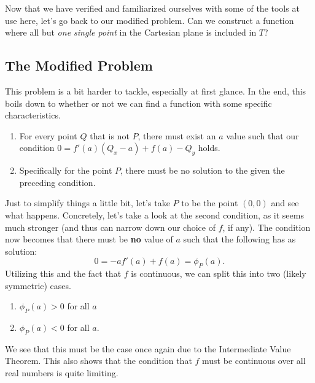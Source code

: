 Now that we have verified and familiarized ourselves with some of the tools at
use here, let's go back to our modified problem. Can we construct a function
where all but \textit{one single point} in the Cartesian plane is included in \( T \)?

\subsection{The Modified Problem}

This problem is a bit harder to tackle, especially at first glance. In the end,
this boils down to whether or not we can find a function with some specific
characteristics.

\begin{enumerate}
    \item For every point \( Q \) that is not \( P \),
        there must exist an \( a \) value such that our condition
        \( 0 = f' \left( a \right) \left( Q_x - a \right) + f \left( a \right) - Q_y \)
        holds.
    \item Specifically for the point \( P \), there must be no solution to the given the preceding condition.
\end{enumerate}

Just to simplify things a little bit, let's take \( P \) to be the point
\( \left( 0, 0 \right) \) and see what happens. Concretely, let's take a look at
the second condition, as it seems much stronger (and thus can narrow down our
choice of \( f \), if any). The condition now becomes that there must be
\textbf{no} value of \( a \) such that the following has as solution:
\[
    0 = -a f' \left( a \right) + f \left( a \right) = \phi_P \left( a \right)
.\]
Utilizing this and the fact that \( f \) is continuous, we can split this into two (likely symmetric) cases.
\begin{multicols}{2}
\begin{enumerate}
    \item \( \phi_P \left( a \right) > 0 \) for all \( a \)
    \item \( \phi_P \left( a \right) < 0 \) for all \( a \).
\end{enumerate}
\end{multicols}
We see that this must be the case once again due to the Intermediate Value
Theorem. This also shows that the condition that \( f \) must be continuous
over all real numbers is quite limiting.

